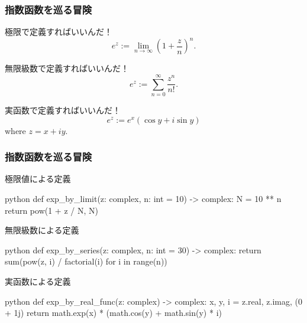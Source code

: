 \documentclass[dvipdfmx,11pt,notheorems]{beamer}
\theoremstyle{definition}
\begin{document}
\begin{frame}\frametitle{指数函数を巡る冒険}

\begin{block}{極限で定義すればいいんだ！}
\begin{equation*}
e^{z} := \lim_{n \to \infty}\left ( 1 + \frac{z}{n} \right )^{n}.
\end{equation*}
\end{block}

\begin{block}{無限級数で定義すればいいんだ！}
\begin{equation*}
e^{z} := \sum^{\infty}_{n=0}\frac{z^{n}}{n!}.
\end{equation*}
\end{block}

\begin{block}{実函数で定義すればいいんだ！}
\begin{equation*}
e^{z} := e^{x}(\cos{y}+i\sin{y}) 
\end{equation*}
where $z = x + iy$.
\end{block}

\end{frame}

\begin{frame}[fragile]\frametitle{指数函数を巡る冒険}

\begin{exampleblock}{極限値による定義}
\begin{pygments}{python}
def exp_by_limit(z: complex, n: int = 10) -> complex:
    N = 10 ** n
    return pow(1 + z / N, N)
\end{pygments}
\end{exampleblock}

\begin{exampleblock}{無限級数による定義}
\begin{pygments}{python}
def exp_by_series(z: complex, n: int = 30) -> complex:
    return sum(pow(z, i) / factorial(i) for i in range(n))
\end{pygments}
\end{exampleblock}

\begin{exampleblock}{実函数による定義}
\begin{pygments}{python}
def exp_by_real_func(z: complex) -> complex:
    x, y, i = z.real, z.imag, (0 + 1j)
    return math.exp(x) * (math.cos(y) + math.sin(y) * i)
\end{pygments}
\end{exampleblock}

\end{frame}
\end{document}
